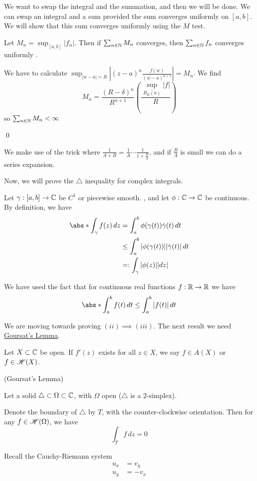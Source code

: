 \documentclass[x11names,reqno,14pt]{extarticle}
\newcommand{\oo}{{\infty}}
\begin{document}
We want to swap the integral and the summation, and then we will be done. We can swap an integral and a sum provided the sum converges uniformly on $[a, b]$. We will show that this sum converges uniformly using the $M$ test. 

Let $M_n = \sup_{[a, b]}|f_n|$. Then if $\sum_{n\in\mathbb{N}}M_n$ converges, then $\sum_{n\in\mathbb{N}}f_n$ converges uniformly . 

We have to calculate $\sup_{|w - a| = R}|(z - a)^n\frac{f(w)}{(w - a)^{n + 1}}| = M_n$. We find
\[
M_n = \frac{(R - \delta)^n}{R^{n + 1}}\left(\frac{\sup_{\bar{B_R(a)}}|f|}{R}\right)
\]
so $\sum_{n\in\N}M_n<\oo$

\qed

We make use of the trick where $\frac{1}{A + B} = \frac{1}{A}\cdots\frac{1}{1 + \frac{B}{A}}$, and if $\frac{B}{A}$ is small we can do a series expansion. 

Now, we will prove the $\bigtriangleup$ inequality for complex integrals.

Let $\gamma:[a, b]\to\mathbb{C}$ be $C^1$ or piecewise smooth. , and let $\phi:\mathbb{C}\to\mathbb{C}$ be continuous. By definition, we have
\begin{align*}
\abs*{\int_\gamma f(z)\,dz} & = \int_a^b\phi(\gamma(t))\dot{\gamma}(t)\,dt \\
							 & \leq \int_a^b|\phi(\gamma(t))||\dot{\gamma}(t)|\,dt \\
							 & =: \int_\gamma |\phi(z)||dz| \\
\end{align*}

We have used the fact that for continuous real functions $f:\mathbb{R}\to\mathbb{R}$ we have 
\[
\abs*{\int_a^b f(t)\,dt} \leq \int_a^b|f(t)|\,dt
\]

We are moving towards proving $(ii) \implies (iii)$. The next result we need \underline{Goursat's Lemma}. 


Let $X \subset \mathbb{C}$ be open. If $f'(z)$ exists for all $z \in X$, we say $f \in A(X)$ or $f \in \mathscr{H}(X)$. 

\lem (Goursat's Lemma)

Let a solid $\bigtriangleup \subset \Omega\subset \mathbb{C}$, with $\Omega$ open ($\bigtriangleup$ is a $2$-simplex). 

Denote the boundary of $\bigtriangleup$ by $T$, with the counter-clockwise orientation. Then for any $f \in \mathscr{H}(\Omega)$, we have
\[
\int_Tf\,dz = 0
\]

\proof

Recall the Cauchy-Riemann system 
\begin{align*}
u_x & = v_y \\
u_y & = -v_x \\
\end{align*}
\end{document}
